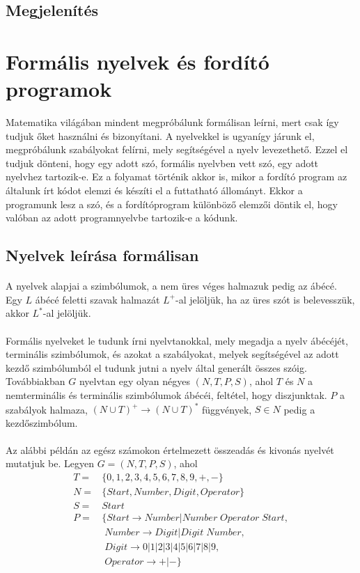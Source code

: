\documentclass{elteikthesis}
\begin{document}
\subsection{Megjelenítés}
\newpage
\section{Formális nyelvek és fordító programok}
Matematika világában mindent megpróbálunk formálisan leírni, mert csak így tudjuk őket használni és bizonyítani. A nyelvekkel is ugyanígy járunk el, megpróbálunk szabályokat felírni, mely segítségével a nyelv levezethető. Ezzel el tudjuk dönteni, hogy egy adott szó, formális nyelvben vett szó, egy adott nyelvhez tartozik-e. Ez a folyamat történik akkor is, mikor a fordító program az általunk írt kódot elemzi és készíti el a futtatható állományt. Ekkor a programunk lesz a szó, és a fordítóprogram különböző elemzői döntik el, hogy valóban az adott programnyelvbe tartozik-e a kódunk.
\subsection{Nyelvek leírása formálisan}
\paragraph{}
A nyelvek alapjai a szimbólumok, a nem üres véges halmazuk pedig az ábécé. Egy $L$ ábécé feletti szavak halmazát $L^+$-al jelöljük, ha az üres szót is belevesszük, akkor $L^*$-al jelöljük.
\paragraph{}
Formális nyelveket le tudunk írni nyelvtanokkal, mely megadja a nyelv ábécéjét, terminális szimbólumok, és azokat a szabályokat, melyek segítségével az adott kezdő szimbólumból el tudunk jutni a nyelv által generált összes szóig. Továbbiakban $G$ nyelvtan egy olyan négyes $(N, T, P, S)$, ahol $T$ és $N$ a nemterminális és terminális szimbólumok ábécéi, feltétel, hogy diszjunktak. $P$ a szabályok halmaza, $(N \cup T)^+ \rightarrow (N \cup T)^*$ függvények, $S \in N$ pedig a kezdőszimbólum.
\paragraph{}
Az alábbi példán az egész számokon értelmezett összeadás és kivonás nyelvét mutatjuk be. Legyen $G=(N, T, P, S)$, ahol
$$
\begin{array}{rl}
T= & \{0, 1, 2, 3, 4, 5, 6, 7, 8, 9, +, -\} \\
N= & \{Start, Number, Digit, Operator\} \\
S= & Start \\
P= & \{Start \rightarrow Number | Number \; Operator \; Start, \\
&\; Number \rightarrow Digit | Digit \; Number, \\
&\; Digit \rightarrow 0 | 1 | 2 | 3 | 4 | 5 | 6 | 7 | 8 | 9, \\
&\; Operator \rightarrow + | -\}
\end{array}
$$
\end{document}
